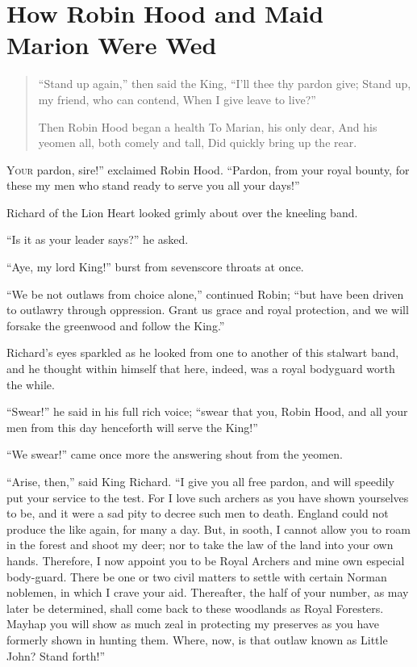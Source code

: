 \chapter{How Robin Hood and Maid Marion Were Wed}

\begin{quote}
“Stand up again,” then said the King,
“I’ll thee thy pardon give;
Stand up, my friend, who can contend,
When I give leave to live?”

Then Robin Hood began a health
To Marian, his only dear,
And his yeomen all, both comely and tall,
Did quickly bring up the rear.
\end{quote}

\lettrine{Y}{our} pardon, sire!” exclaimed Robin Hood. ``Pardon, from your royal
bounty, for these my men who stand ready to serve you all your days!''

Richard of the Lion Heart looked grimly about over the kneeling band.

``Is it as your leader says?'' he asked.

``Aye, my lord King!'' burst from sevenscore throats at once.

``We be not outlaws from choice alone,'' continued Robin; ``but have
been driven to outlawry through oppression. Grant us grace and royal
protection, and we will forsake the greenwood and follow the King.''

Richard's eyes sparkled as he looked from one to another of this
stalwart band, and he thought within himself that here, indeed, was a
royal bodyguard worth the while.

``Swear!'' he said in his full rich voice; ``swear that you, Robin Hood,
and all your men from this day henceforth will serve the King!''

``We swear!'' came once more the answering shout from the yeomen.

``Arise, then,'' said King Richard. ``I give you all free pardon, and
will speedily put your service to the test. For I love such archers as
you have shown yourselves to be, and it were a sad pity to decree such
men to death. England could not produce the like again, for many a day.
But, in sooth, I cannot allow you to roam in the forest and shoot my
deer; nor to take the law of the land into your own hands. Therefore, I
now appoint you to be Royal Archers and mine own especial body-guard.
There be one or two civil matters to settle with certain Norman
noblemen, in which I crave your aid. Thereafter, the half of your
number, as may later be determined, shall come back to these woodlands
as Royal Foresters. Mayhap you will show as much zeal in protecting my
preserves as you have formerly shown in hunting them. Where, now, is
that outlaw known as Little John? Stand forth!''


